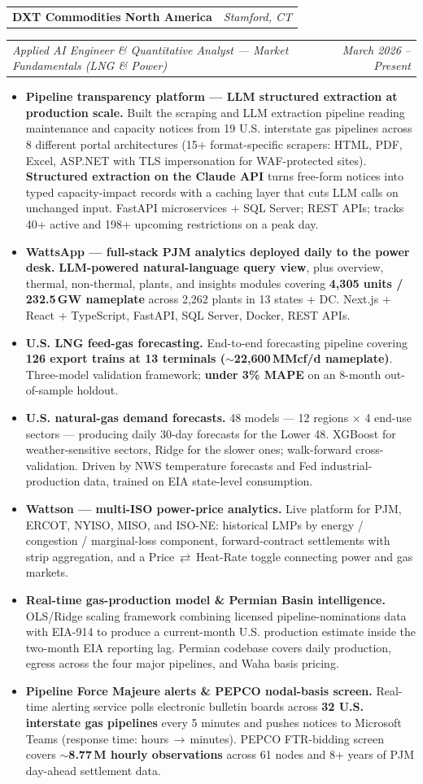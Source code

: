 \documentclass[10pt,letterpaper]{article}
\makeatletter
\newcommand{\entryrow}[2]{%
  \noindent\begin{tabularx}{\linewidth}{@{}X@{}r@{}}%
    #1 & #2 \\
  \end{tabularx}\par\vspace{1pt}%
}
\newcommand{\headline}[4]{%
  \entryrow{\textbf{#1}}{\normalfont\itshape #2}%
  \entryrow{\textit{#3}}{\normalfont\itshape #4}%
}
\makeatother
\begin{document}
\headline{DXT Commodities North America}{Stamford, CT}{Applied AI Engineer \& Quantitative Analyst --- Market Fundamentals (LNG \& Power)}{March 2026 -- Present}
\begin{itemize}
  \item \textbf{Pipeline transparency platform --- LLM structured extraction at production scale.} Built the scraping and LLM extraction pipeline reading maintenance and capacity notices from 19 U.S. interstate gas pipelines across 8 different portal architectures (15+ format-specific scrapers: HTML, PDF, Excel, ASP.NET with TLS impersonation for WAF-protected sites). \textbf{Structured extraction on the Claude API} turns free-form notices into typed capacity-impact records with a caching layer that cuts LLM calls on unchanged input. FastAPI microservices + SQL Server; REST APIs; tracks 40+ active and 198+ upcoming restrictions on a peak day.
  \item \textbf{WattsApp --- full-stack PJM analytics deployed daily to the power desk.} \textbf{LLM-powered natural-language query view}, plus overview, thermal, non-thermal, plants, and insights modules covering \textbf{4,305 units / 232.5\,GW nameplate} across 2,262 plants in 13 states + DC. Next.js + React + TypeScript, FastAPI, SQL Server, Docker, REST APIs.
  \item \textbf{U.S. LNG feed-gas forecasting.} End-to-end forecasting pipeline covering \textbf{126 export trains at 13 terminals ($\sim$22,600\,MMcf/d nameplate)}. Three-model validation framework; \textbf{under 3\% MAPE} on an 8-month out-of-sample holdout.
  \item \textbf{U.S. natural-gas demand forecasts.} 48 models --- 12 regions $\times$ 4 end-use sectors --- producing daily 30-day forecasts for the Lower 48. XGBoost for weather-sensitive sectors, Ridge for the slower ones; walk-forward cross-validation. Driven by NWS temperature forecasts and Fed industrial-production data, trained on EIA state-level consumption.
  \item \textbf{Wattson --- multi-ISO power-price analytics.} Live platform for PJM, ERCOT, NYISO, MISO, and ISO-NE: historical LMPs by energy / congestion / marginal-loss component, forward-contract settlements with strip aggregation, and a Price\,$\rightleftarrows$\,Heat-Rate toggle connecting power and gas markets.
  \item \textbf{Real-time gas-production model \& Permian Basin intelligence.} OLS/Ridge scaling framework combining licensed pipeline-nominations data with EIA-914 to produce a current-month U.S. production estimate inside the two-month EIA reporting lag. Permian codebase covers daily production, egress across the four major pipelines, and Waha basis pricing.
  \item \textbf{Pipeline Force Majeure alerts \& PEPCO nodal-basis screen.} Real-time alerting service polls electronic bulletin boards across \textbf{32 U.S. interstate gas pipelines} every 5 minutes and pushes notices to Microsoft Teams (response time: hours\,$\rightarrow$\,minutes). PEPCO FTR-bidding screen covers \textbf{$\sim$8.77\,M hourly observations} across 61 nodes and 8+ years of PJM day-ahead settlement data.
\end{itemize}
\end{document}
